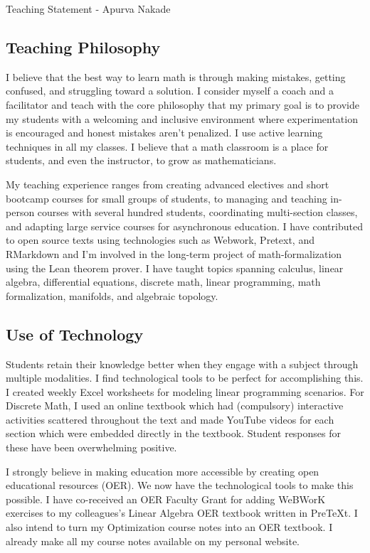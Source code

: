 \documentclass[10pt]{amsbook}
\begin{document}
\begin{center}
  \huge{Teaching Statement - Apurva Nakade}
\end{center}
\vspace{1em}

\subsection*{Teaching Philosophy}
  I believe that the best way to learn math is through making mistakes, getting confused, and struggling toward a solution. I consider myself a coach and a facilitator and teach with the core philosophy that my primary goal is to provide my students with a welcoming and inclusive environment where experimentation is encouraged and honest mistakes aren't penalized. 
  I use active learning techniques in all my classes. 
  I believe that a math classroom is a place for students, and even the instructor, to grow as mathematicians.

  My teaching experience ranges from creating advanced electives and short bootcamp courses for small groups of students, to managing and teaching in-person courses with several hundred students, coordinating multi-section classes, and adapting large service courses for asynchronous education. I have contributed to open source texts using technologies such as Webwork, Pretext, and RMarkdown and I'm involved in the long-term project of math-formalization using the Lean theorem prover. I have taught topics spanning calculus, linear algebra, differential equations, discrete math, linear programming, math formalization, manifolds, and algebraic topology.

  \subsection*{Use of Technology}
  Students retain their knowledge better when they engage with a subject through multiple modalities. I find technological tools to be perfect for accomplishing this. I created weekly Excel worksheets for modeling linear programming scenarios. For Discrete Math, I used an online textbook which had (compulsory) interactive activities scattered throughout the text and made YouTube videos for each section which were embedded directly in the textbook. 
  Student responses for these have been overwhelming positive.

  I strongly believe in making education more accessible by creating open educational resources (OER). We now have the technological tools to make this possible. 
  I have co-received an OER Faculty Grant for adding WeBWorK exercises to my colleagues's Linear Algebra OER textbook written in PreTeXt. I also intend to turn my Optimization course notes into an OER textbook. I already make all my course notes available on my personal website.  
\end{document}
